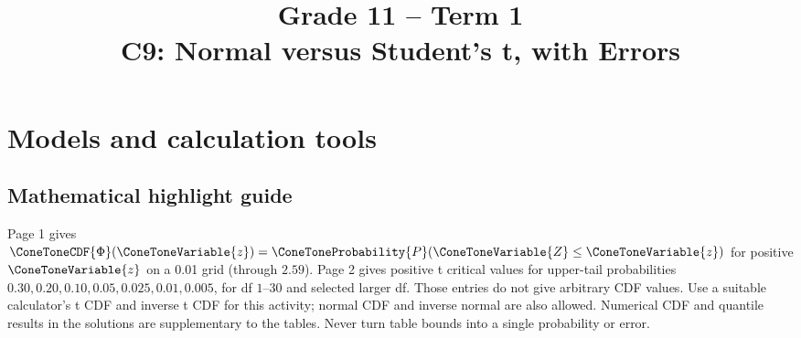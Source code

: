 \makeatletter
{}
\makeatother



\COneTonePracticePalette

\setlength{\parskip}{3pt}\AtBeginDocument{\setlength{\abovedisplayskip}{4pt}\setlength{\belowdisplayskip}{4pt}}
\title{Grade 11 -- Term 1 \\ C9: Normal versus Student's t, with Errors}

\author{}\date{}

\maketitle
\setcounter{tocdepth}{1}\setcounter{secnumdepth}{2}
\label{toc}\tableofcontents
\section{Models and calculation tools}
\label{sec:tools}
\subsection*{Mathematical highlight guide}
\label{tone:C9:legend}

Page 1 gives $\ConeToneCDF{\Phi}(\ConeToneVariable{z})=\ConeToneProbability{P}(\ConeToneVariable{Z}\le \ConeToneVariable{z})$ for positive $\ConeToneVariable{z}$ on a 0.01 grid (through $2.59$).
Page 2 gives positive t critical values for upper-tail probabilities
$0.30,0.20,0.10,0.05,0.025,0.01,0.005$, for df $1$--$30$ and selected larger df.
Those entries do not give arbitrary CDF values. Use a suitable calculator's t CDF and inverse t CDF for this activity;
normal CDF and inverse normal are also allowed. Numerical CDF and quantile results in the solutions are supplementary to the tables.
Never turn table bounds into a single probability or error.

